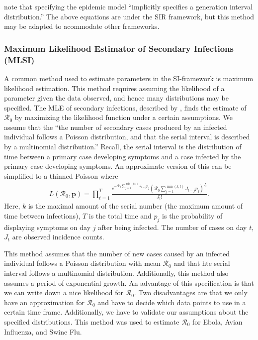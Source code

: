 \documentclass[12pt]{article}
\newcommand{\rr}{\ensuremath{\mathcal{R}_0}}
\begin{document}
\citeauthor{wallinga2007generation} note that specifying the epidemic model ``implicitly specifies a generation interval distribution.''  The above equations are under the SIR framework, but this method may be adapted to acommodate other frameworks.

\subsubsection{Maximum Likelihood Estimator of Secondary Infections (MLSI)}\label{sec:mle-si}
A common method used to estimate parameters in the SI-framework is maximum likelihood estimation.  This method requires assuming the likelihood of a parameter given the data observed, and hence many distributions may be specified.  The MLE of secondary infections, described by \cite{forsberg2008}, finds the estimate of $\rr$ by maximizing the likelihood function under a certain assumptions.  We assume that the ``the number of secondary cases produced by an infected individual follows a Poisson distribution, and that the serial interval is described by a multinomial distribution.''  Recall, the serial interval is the distribution of time between a primary case developing symptoms and a case infected by the primary case developing symptoms.  An approximate version of this can be simplified to a thinned Poisson  where
\begin{align}\label{eq:mlesi}
  L(\rr, \mathbf{p}) = \prod_{t=1}^T \frac{e^{- \rr \sum_{j=1}^{\min(k,t)}J_{t-j}p_j}\left (\rr \sum_{j=1}^{\min(k,t)}J_{t-j}p_j \right )^{J_t}}{J_t!}.
\end{align}
Here, $k$ is the maximal amount of the serial number (the maximum amount of time between infections), $T$ is the total time and $p_j$ is the probability of displaying symptoms on day $j$ after being infected.  The number of cases on day $t$, $J_t$ are observed incidence counts.

This method assumes that the number of new cases caused by an infected individual follows a Poisson distribution with mean $\rr$ and that hte serial interval follows a multinomial distribution. Additionally, this method also assumes a period of exponential growth.  An advantage of this specification is that we can write down a nice likelihood for $\rr$. Two disadvantages are that we only have an approximation for $\rr$ and have to decide which data points to use in a certain time frame.  Additionally, we have to validate our assumptions about the specified distributions.  This method was used to estimate $\rr$ for Ebola, Avian Influenza, and Swine Flu.
\end{document}
